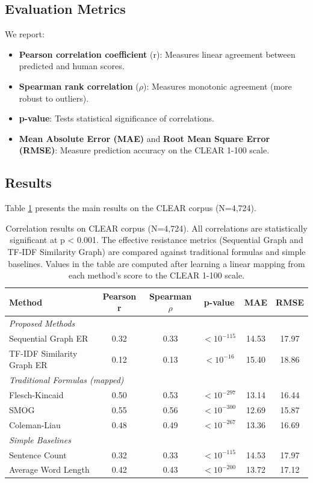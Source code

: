 \documentclass[11pt,letterpaper]{article}
\begin{document}
\subsection{Evaluation Metrics}

We report:

\begin{itemize}
    \item \textbf{Pearson correlation coefficient} (r): Measures linear agreement between predicted and human scores.
    \item \textbf{Spearman rank correlation} ($\rho$): Measures monotonic agreement (more robust to outliers).
    \item \textbf{p-value}: Tests statistical significance of correlations.
    \item \textbf{Mean Absolute Error (MAE)} and \textbf{Root Mean Square Error (RMSE)}: Measure prediction accuracy on the CLEAR 1-100 scale.
\end{itemize}

\subsection{Results}

Table \ref{tab:results} presents the main results on the CLEAR corpus (N=4,724).

\begin{table}[!htbp]
\centering
\caption{Correlation results on CLEAR corpus (N=4,724). All correlations are statistically significant at p < 0.001. The effective resistance metrics (Sequential Graph and TF-IDF Similarity Graph) are compared against traditional formulas and simple baselines. Values in the table are computed after learning a linear mapping from each method's score to the CLEAR 1-100 scale.}
\label{tab:results}
\begin{tabular}{lccccc}
\toprule
\textbf{Method} & \textbf{Pearson r} & \textbf{Spearman $\rho$} & \textbf{p-value} & \textbf{MAE} & \textbf{RMSE} \\
\midrule
\multicolumn{6}{l}{\textit{Proposed Methods}} \\
Sequential Graph ER & 0.32 & 0.33 & $< 10^{-115}$ & 14.53 & 17.97 \\
TF-IDF Similarity Graph ER & 0.12 & 0.13 & $< 10^{-16}$ & 15.40 & 18.86 \\
\midrule
\multicolumn{6}{l}{\textit{Traditional Formulas (mapped)}} \\
Flesch-Kincaid & 0.50 & 0.53 & $< 10^{-297}$ & 13.14 & 16.44 \\
SMOG & 0.55 & 0.56 & $< 10^{-300}$ & 12.69 & 15.87 \\
Coleman-Liau & 0.48 & 0.49 & $< 10^{-267}$ & 13.36 & 16.69 \\
\midrule
\multicolumn{6}{l}{\textit{Simple Baselines}} \\
Sentence Count & 0.32 & 0.33 & $< 10^{-115}$ & 14.53 & 17.97 \\
Average Word Length & 0.42 & 0.43 & $< 10^{-200}$ & 13.72 & 17.12 \\
\bottomrule
\end{tabular}
\end{table}
\end{document}
